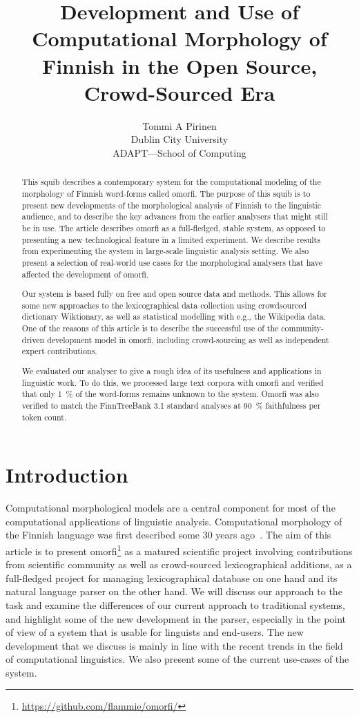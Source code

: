 \documentclass[a4paper,12pt]{article}
\title{Development and Use of Computational Morphology of Finnish in
the Open Source, Crowd-Sourced Era}
\author{Tommi A Pirinen \\
    Dublin City University\\
    ADAPT---School of Computing}
\date{}
\begin{document}
\maketitle
\begin{abstract}

    This squib describes a contemporary system for the computational modeling
    of the morphology of Finnish word-forms called omorfi. The purpose of this
    squib is to present new developments of the morphological analysis of
    Finnish to the linguistic audience, and to describe the key advances from
    the earlier analysers that might still be in use. The article describes
    omorfi as a full-fledged, stable system, as opposed to presenting a new
    technological feature in a limited experiment. We describe results from
    experimenting the system in large-scale linguistic analysis setting. We also
    present a selection of real-world use cases for the morphological analysers
    that have affected the development of omorfi.

    Our system is based fully on free and open source data and methods. This
    allows for some new approaches to the lexicographical data collection using
    crowd\-sour\-ced dictionary Wiktionary, as well as statistical modelling
    with e.g., the Wikipedia data.  One of the reasons of this article is to 
    describe the successful use of the community-driven development model in
    omorfi, including crowd-sourcing as well as independent expert
    contributions.

    We evaluated our analyser to give a rough idea of its usefulness and
    applications in linguistic work. To do this, we processed large text
    corpora with omorfi and verified that only 1~\% of the word-forms
    remains unknown to the system. Omorfi was also verified to match the
    FinnTreeBank 3.1 standard analyses at 90~\% faithfulness per token
    count.
\end{abstract}

\section{Introduction}

Computational morphological models are a central component for most of the
computational applications of linguistic analysis. Computational morphology
of the Finnish language was first described some 30 years
ago~\citep{koskenniemi1983twolevel}. The aim of this article is to present
omorfi\footnote{
\url{https://github.com/flammie/omorfi/}} as a matured scientific project involving contributions from
scientific community as well as crowd-sourced lexicographical additions, as
a full-fledged project for managing lexicographical database on one hand and
its natural language parser on the other hand. We will discuss our approach
to the task and examine the differences of our current approach to
traditional systems, and highlight some of the new development in the
parser, especially in the point of view of a system that is usable for
linguists and end-users. The new development that we discuss is mainly in
line with the recent trends in the field of computational linguistics. We
also present some of the current use-cases of the system.
\end{document}
